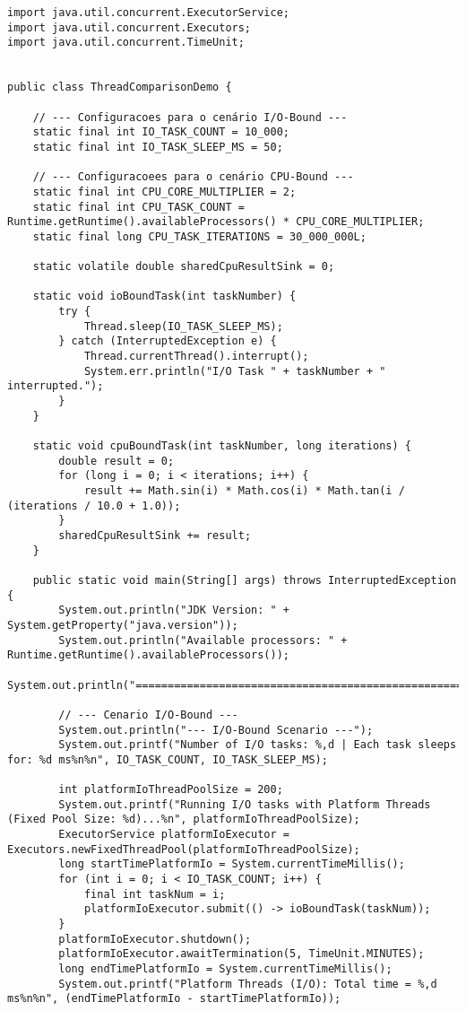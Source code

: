 \documentclass[12pt,a4paper]{article}
\begin{document}
\begin{lstlisting}[caption=Código Java do Experimento (ThreadComparisonDemo.java), label=lst:code]
import java.util.concurrent.ExecutorService;
import java.util.concurrent.Executors;
import java.util.concurrent.TimeUnit;


public class ThreadComparisonDemo {

    // --- Configuracoes para o cenário I/O-Bound ---
    static final int IO_TASK_COUNT = 10_000;
    static final int IO_TASK_SLEEP_MS = 50;

    // --- Configuracoees para o cenário CPU-Bound ---
    static final int CPU_CORE_MULTIPLIER = 2;
    static final int CPU_TASK_COUNT = Runtime.getRuntime().availableProcessors() * CPU_CORE_MULTIPLIER;
    static final long CPU_TASK_ITERATIONS = 30_000_000L;

    static volatile double sharedCpuResultSink = 0;

    static void ioBoundTask(int taskNumber) {
        try {
            Thread.sleep(IO_TASK_SLEEP_MS);
        } catch (InterruptedException e) {
            Thread.currentThread().interrupt();
            System.err.println("I/O Task " + taskNumber + " interrupted.");
        }
    }

    static void cpuBoundTask(int taskNumber, long iterations) {
        double result = 0;
        for (long i = 0; i < iterations; i++) {
            result += Math.sin(i) * Math.cos(i) * Math.tan(i / (iterations / 10.0 + 1.0));
        }
        sharedCpuResultSink += result;
    }

    public static void main(String[] args) throws InterruptedException {
        System.out.println("JDK Version: " + System.getProperty("java.version"));
        System.out.println("Available processors: " + Runtime.getRuntime().availableProcessors());
        System.out.println("======================================================");

        // --- Cenario I/O-Bound ---
        System.out.println("--- I/O-Bound Scenario ---");
        System.out.printf("Number of I/O tasks: %,d | Each task sleeps for: %d ms%n%n", IO_TASK_COUNT, IO_TASK_SLEEP_MS);

        int platformIoThreadPoolSize = 200;
        System.out.printf("Running I/O tasks with Platform Threads (Fixed Pool Size: %d)...%n", platformIoThreadPoolSize);
        ExecutorService platformIoExecutor = Executors.newFixedThreadPool(platformIoThreadPoolSize);
        long startTimePlatformIo = System.currentTimeMillis();
        for (int i = 0; i < IO_TASK_COUNT; i++) {
            final int taskNum = i;
            platformIoExecutor.submit(() -> ioBoundTask(taskNum));
        }
        platformIoExecutor.shutdown();
        platformIoExecutor.awaitTermination(5, TimeUnit.MINUTES);
        long endTimePlatformIo = System.currentTimeMillis();
        System.out.printf("Platform Threads (I/O): Total time = %,d ms%n%n", (endTimePlatformIo - startTimePlatformIo));


\end{lstlisting}
\end{document}
